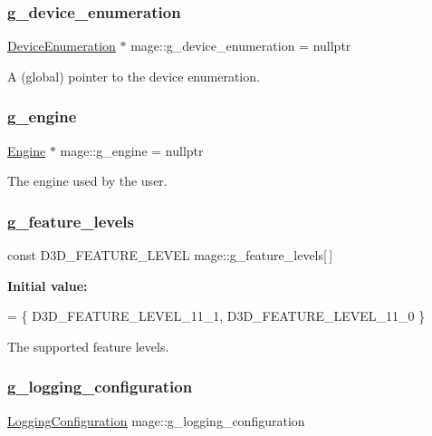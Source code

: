 \subsubsection{\texorpdfstring{g\+\_\+device\+\_\+enumeration}{g\_device\_enumeration}}
{\footnotesize\ttfamily \hyperlink{classmage_1_1_device_enumeration}{Device\+Enumeration} $\ast$ mage\+::g\+\_\+device\+\_\+enumeration = nullptr}

A (global) pointer to the device enumeration. \hypertarget{namespacemage_a84bf83f1e8779d884452cdf08f56c19a}{}\label{namespacemage_a84bf83f1e8779d884452cdf08f56c19a} 
\subsubsection{\texorpdfstring{g\+\_\+engine}{g\_engine}}
{\footnotesize\ttfamily \hyperlink{classmage_1_1_engine}{Engine} $\ast$ mage\+::g\+\_\+engine = nullptr}

The engine used by the user. \hypertarget{namespacemage_add3b7e051df553262371e077d9d66fd9}{}\label{namespacemage_add3b7e051df553262371e077d9d66fd9} 
\subsubsection{\texorpdfstring{g\+\_\+feature\+\_\+levels}{g\_feature\_levels}}
{\footnotesize\ttfamily const D3\+D\+\_\+\+F\+E\+A\+T\+U\+R\+E\+\_\+\+L\+E\+V\+EL mage\+::g\+\_\+feature\+\_\+levels\mbox{[}$\,$\mbox{]}}

{\bfseries Initial value\+:}
\begin{DoxyCode}
= \{
        D3D\_FEATURE\_LEVEL\_11\_1,
        D3D\_FEATURE\_LEVEL\_11\_0
    \}
\end{DoxyCode}
The supported feature levels. \hypertarget{namespacemage_a162413669f92d91c7ee135d60f93fcf1}{}\label{namespacemage_a162413669f92d91c7ee135d60f93fcf1} 
\subsubsection{\texorpdfstring{g\+\_\+logging\+\_\+configuration}{g\_logging\_configuration}}
{\footnotesize\ttfamily \hyperlink{structmage_1_1_logging_configuration}{Logging\+Configuration} mage\+::g\+\_\+logging\+\_\+configuration}

